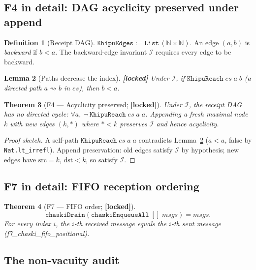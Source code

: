 \documentclass[11pt,letterpaper]{article}
\newcommand{\lean}[1]{{\small\ttfamily #1}}
\newcommand{\lb}{\discretionary{}{}{}}
\newtheorem{theorem}{Theorem}[section]
\newtheorem{lemma}[theorem]{Lemma}
\theoremstyle{definition}
\newtheorem{definition}[theorem]{Definition}
\newcommand{\locked}{\textbf{[locked]}}
\begin{document}
\subsection{F4 in detail: DAG acyclicity preserved under append}

\begin{definition}[Receipt DAG]
$\texttt{KhipuEdges} := \texttt{List}\,(\mathbb{N}\times\mathbb{N})$.
An edge $(a,b)$ is \emph{backward} if $b < a$.  The backward-edge invariant
$\mathcal{I}$ requires every edge to be backward.
\end{definition}

\begin{lemma}[Paths decrease the index]\label{lem:f4decrease}
\locked{} Under $\mathcal{I}$, if $\texttt{KhipuReach}\;es\;a\;b$ (a directed
path $a \rightsquigarrow b$ in $es$), then $b < a$.
\end{lemma}

\begin{theorem}[F4 --- Acyclicity preserved; \locked{}]
Under $\mathcal{I}$, the receipt DAG has no directed cycle:
$\forall a,\; \neg\,\texttt{KhipuReach}\;es\;a\;a$.  Appending a fresh maximal
node $k$ with new edges $(k, \ast)$ where $\ast < k$ preserves $\mathcal{I}$
and hence acyclicity.
\end{theorem}

\begin{proof}[Proof sketch]
A self-path $\texttt{KhipuReach}\;es\;a\;a$ contradicts Lemma~\ref{lem:f4decrease}
($a < a$, false by \texttt{Nat.lt\_irrefl}).  Append preservation: old edges
satisfy $\mathcal{I}$ by hypothesis; new edges have $\mathrm{src}=k$,
$\mathrm{dst}<k$, so satisfy $\mathcal{I}$.
\end{proof}

\subsection{F7 in detail: FIFO reception ordering}

\begin{theorem}[F7 --- FIFO order; \locked{}]
\[
  \texttt{chaskiDrain}(\texttt{chaskiEnqueueAll}\;[]\;\mathit{msgs}) = \mathit{msgs}.
\]
For every index $i$, the $i$-th received message equals the $i$-th sent message
(\lean{f7\_\lb chaski\_\lb fifo\_\lb positional}).
\end{theorem}

\subsection{The non-vacuity audit}
\end{document}
